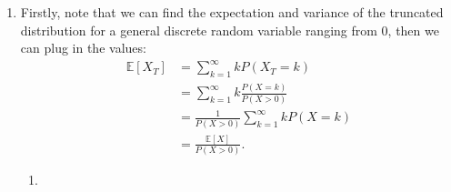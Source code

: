 \documentclass{article}
\begin{document}
\begin{enumerate}
    \item Firstly, note that we can find the expectation and variance of the truncated distribution for a 
    general discrete random variable ranging from 0, then we can plug in the values:
    \begin{align*}
        \mathbb{E}[X_{T}]
        &= \sum_{k = 1}^{\infty} kP(X_{T} = k) \\
        &= \sum_{k = 1}^{\infty} k\frac{P(X = k)}{P(X > 0)} \\
        &= \frac{1}{P(X > 0)} \sum_{k = 1}^{\infty} kP(X = k) \\
        &= \frac{\mathbb{E}[X]}{P(X > 0)}.
    \end{align*}
    \begin{enumerate}
        \item 
    \end{enumerate}
\end{enumerate}
\end{document}
